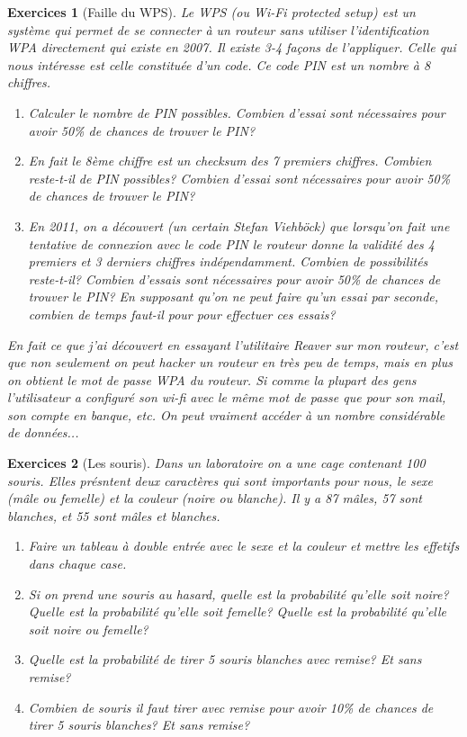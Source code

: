 \documentclass[a4paper,12pt]{book}
\newtheorem*{exercices}{Exercices}
\begin{document}
\begin{exercices}[Faille du WPS]
Le WPS (ou Wi-Fi protected setup) est un système qui permet de se connecter à un routeur
sans utiliser l'identification WPA directement qui existe en 2007. Il existe 3-4 façons de l'appliquer. Celle qui nous intéresse 
est celle constituée d'un code. Ce code PIN est un nombre à 8 chiffres.
 \begin{enumerate}
  \item Calculer le nombre de PIN possibles. Combien d'essai sont nécessaires pour avoir 50\% de chances de trouver le PIN?
  \item En fait le 8ème chiffre est un checksum des 7 premiers chiffres. Combien reste-t-il de PIN possibles?
  Combien d'essai sont nécessaires pour avoir 50\% de chances de trouver le PIN?
  \item En 2011, on a découvert (un certain Stefan Viehböck) que lorsqu'on fait une tentative 
  de connexion avec le code PIN le routeur donne la validité des 4 premiers et 3 derniers chiffres indépendamment. Combien de 
  possibilités reste-t-il? Combien d'essais sont nécessaires pour avoir 50\% de chances de trouver le PIN? En supposant qu'on ne peut faire 
  qu'un essai par seconde, combien de temps faut-il pour pour effectuer ces essais?
 \end{enumerate}
 En fait ce que j'ai découvert en essayant l'utilitaire Reaver sur mon routeur, c'est que non seulement on peut hacker 
 un routeur en très peu de temps, mais en plus on obtient le mot de passe WPA du routeur. Si comme la plupart des gens l'utilisateur
 a configuré son wi-fi avec le même mot de passe que pour son mail, son compte en banque, etc. On peut vraiment accéder à 
 un nombre considérable de données...
\end{exercices}
% 
\begin{exercices}[Les souris]
Dans un laboratoire on a une cage contenant 100 souris. Elles présntent deux caractères qui sont
importants pour nous, le sexe (mâle ou femelle) et la couleur (noire ou blanche). Il y a 87 mâles,
57 sont blanches, et 55 sont mâles et blanches.
 \begin{enumerate}
  \item Faire un tableau à double entrée avec le sexe et la couleur et mettre les effetifs dans chaque case.
  \item Si on prend une souris au hasard, quelle est la probabilité qu'elle soit noire? Quelle est la probabilité qu'elle soit femelle?
  Quelle est la probabilité qu'elle soit noire ou femelle?
  \item Quelle est la probabilité de tirer 5 souris blanches avec remise? Et sans remise?
  \item Combien de souris il faut tirer avec remise pour avoir 10\% de chances de tirer 5 souris blanches? Et sans remise?
 \end{enumerate}
\end{exercices}
\end{document}

